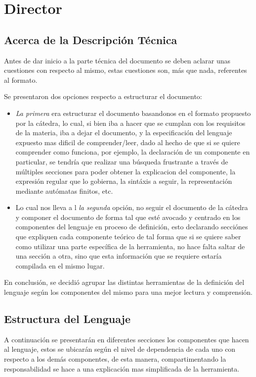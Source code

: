 
\chapter{Director}
\label{sec:director}

\section*{Acerca de la Descripción Técnica}
\label{sec:acerca_del_documento}
Antes de dar inicio a la parte técnica del documento se deben aclarar unas
cuestiones con respecto al mismo, estas cuestiones son, más que nada,
referentes al formato.

Se presentaron dos opciones respecto a estructurar el documento:

\begin{itemize}
\item \textit{La primera} era estructurar el documento basandonos en el formato
propuesto por la cátedra, lo cual, si bien iba a hacer que se cumplan con los
requisitos de la materia, iba a dejar el documento, y la especificación del
lenguaje expuesto mas dificil de comprender/leer, dado al hecho de  que si se
quiere comprender como funciona, por ejemplo, la declaración de un componente
en particular, se tendría que realizar una búsqueda frustrante a través de
múltiples secciones para poder obtener la explicacion del componente, la
expresión regular que lo gobierna, la sintáxis a seguir, la representación
mediante autómatas finitos, etc.
\item Lo cual nos lleva a l \textit{la segunda} opción, no seguir el documento
de la cátedra y componer el documento de forma tal que esté avocado y centrado
en los componentes del lenguaje en proceso de definición, esto declarando
secciónes que expliquen cada componente teórico de tal forma que si se quiere
saber como utilizar una parte específica de la herramienta, no hace falta
saltar de una sección a otra, sino que esta información que se requiere estaría
compilada en el mismo lugar.
\end{itemize}

En conclusión, se decidió agrupar las distintas herramientas de la definición
del lenguaje según los componentes del mismo para una mejor lectura y
comprensión.


\section*{Estructura del Lenguaje}
A continuación se presentarán en diferentes secciones los componentes que
hacen al lenguaje, estos se ubicarán según el nivel de dependencia de cada uno
con respecto a los demás componentes, de esta manera, compartimentando la
responsabilidad se hace a una explicación mas simplificada de la herramienta.


